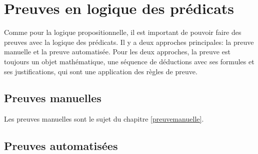 

\section{Preuves en logique des prédicats}

Comme pour la logique propositionnelle, il est important de pouvoir faire des preuves avec la logique des prédicats.
Il y a deux approches principales: la preuve manuelle et la preuve automatisée.
Pour les deux approches, la preuve est toujours un objet mathématique, une séquence de déductions avec ses formules et
ses justifications, qui sont une application des règles de preuve.

\subsection{Preuves manuelles}

Les preuves manuelles sont le sujet du chapitre \ref{preuvemanuelle}.

\subsection{Preuves automatisées}

